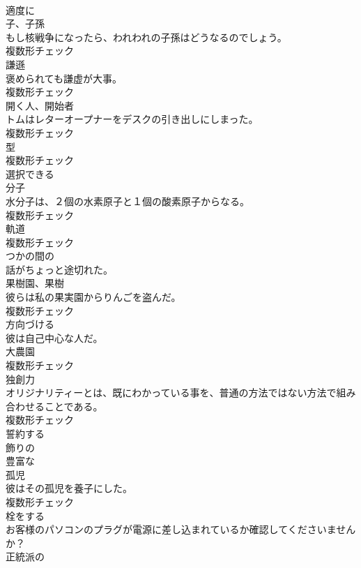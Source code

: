 \documentclass[8pt]{extreport}
\begin{document}
\begin{CJK}{UTF8}{min}
\\	[副詞]	適度に	
\\	[名詞]	子、子孫	
\\	もし核戦争になったら、われわれの子孫はどうなるのでしょう。	
\\	複数形チェック
\\	[名詞]	謙遜	
\\	褒められても謙虚が大事。	
\\	複数形チェック
\\	[名詞]	開く人、開始者	
\\	トムはレターオープナーをデスクの引き出しにしまった。	
\\	複数形チェック
\\	[名詞]	型	
\\	複数形チェック
\\	[形容詞]	選択できる	
\\	[名詞]	分子	
\\	水分子は、２個の水素原子と１個の酸素原子からなる。	
\\	複数形チェック
\\	[名詞]	軌道	
\\	複数形チェック
\\	[形容詞]	つかの間の	
\\	話がちょっと途切れた。	
\\	[名詞]	果樹園、果樹	
\\	彼らは私の果実園からりんごを盗んだ。	
\\	複数形チェック
\\	[動詞]	方向づける	
\\	彼は自己中心な人だ。	
\\	[名詞]	大農園	
\\	複数形チェック
\\	[名詞]	独創力	
\\	オリジナリティーとは、既にわかっている事を、普通の方法ではない方法で組み合わせることである。	
\\	複数形チェック
\\	[動詞]	誓約する	
\\	[形容詞]	飾りの	
\\	[形容詞]	豊富な	
\\	[名詞]	孤児	
\\	彼はその孤児を養子にした。	
\\	複数形チェック
\\	[動詞]	栓をする	
\\	お客様のパソコンのプラグが電源に差し込まれているか確認してくださいませんか？	
\\	[形容詞]	正統派の	

\end{CJK}
\end{document}
